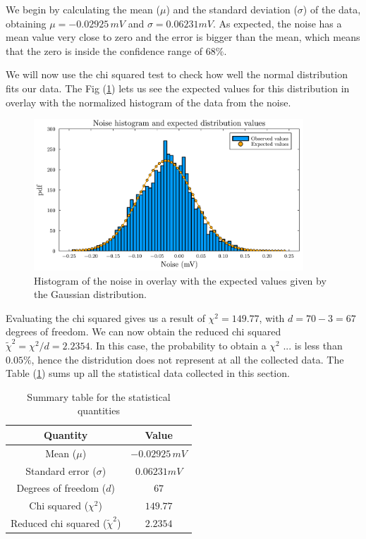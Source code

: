 \documentclass[a4paper,12pt]{article}
\begin{document}
\par We begin by calculating the mean ($\mu$) and the standard deviation 
($\sigma$) of the data, obtaining $\mu = -0.02925 \, mV$ and $\sigma = 0.06231 mV$.
As expected, the noise has a mean value very close to zero and the error is 
bigger than the mean, which means that the zero is inside the confidence 
range of $68\%$.  

\par We will now use the chi squared test to check how well the normal 
distribution fits our data. The Fig (\ref{plot:Hist_Gauss}) lets us see the expected 
values for this distribution in overlay with the normalized histogram 
of the data from the noise.
\begin{figure}[H]
    \centering
    \includegraphics[width=0.9\textwidth]{Noise_hist_and_Normal_distr_expected_v.pdf}
    \caption{Histogram of the noise in overlay with the expected values given by the Gaussian distribution.}
    \label{plot:Hist_Gauss}
\end{figure}

\par Evaluating the chi squared gives us a result of $\chi^2 = 149.77$, 
with $d=70-3=67$ degrees of freedom. We can now obtain the reduced 
chi squared $\tilde{\chi}^2 = \chi^2 / d = 2.2354$. In this case, 
the probability to obtain a  $\chi^2$ ... is less than $0.05\%$, 
hence the distridution does not represent at all the collected data.
The Table (\ref{tab:summary_table}) 
sums up all the statistical data collected in this section.

\begin{table}[h]
    \centering
    \begin{tabular}{|c|c|}
        \hline
        Quantity & Value \\
        \hline
        Mean ($\mu$) & $-0.02925 \, mV$ \\
        \hline
        Standard error ($\sigma$) & $0.06231 mV$ \\
        \hline
        Degrees of freedom ($d$) & $67$ \\
        \hline
        Chi squared ($\chi^2$) & $149.77$ \\
        \hline
        Reduced chi squared ($\tilde{\chi}^2$) & $2.2354$ \\
        \hline
    \end{tabular}
    \caption{Summary table for the statistical quantities}
    \label{tab:summary_table}
\end{table}
\end{document}
